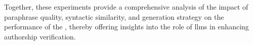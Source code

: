 Together, these experiments provide a comprehensive analysis of the impact of paraphrase quality, syntactic similarity, and \imp{} generation strategy on the performance of the \impAppr{}, thereby offering insights into the role of \acp{llm} in enhancing authorship verification.


















